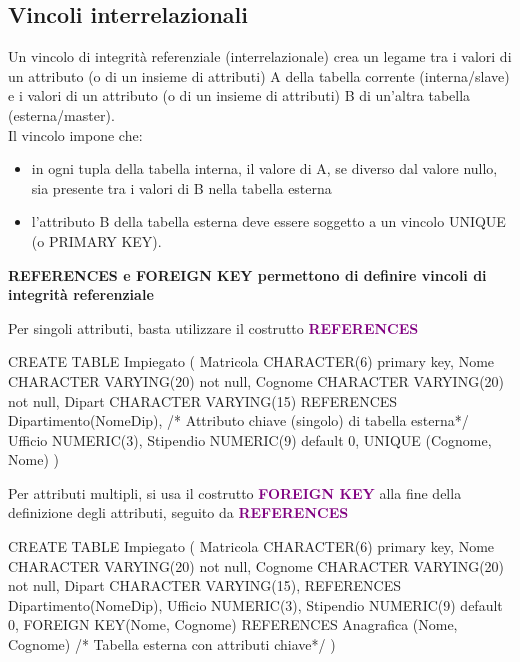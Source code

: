   \subsection{Vincoli interrelazionali}
  Un vincolo di integrità referenziale (interrelazionale) crea un legame tra i valori di un attributo (o di un insieme di attributi) A della tabella corrente (interna/slave) e i valori di un attributo (o di un insieme di attributi) B di un'altra tabella (esterna/master).\\[0.2ex]
  Il vincolo impone che:
  \begin{itemize}[itemsep=\smallskipamount]
    \item in ogni tupla della tabella interna, il valore di A, se diverso dal valore nullo, sia presente tra i valori di B nella tabella esterna
    \item  l'attributo B della tabella esterna deve essere soggetto a un vincolo UNIQUE (o PRIMARY KEY).
  \end{itemize}
  

  \textbf{REFERENCES e FOREIGN KEY permettono di definire vincoli di integrità referenziale}

Per singoli attributi, basta utilizzare il costrutto \textcolor{purple}{\textbf{REFERENCES}}
\begin{codiceSQL}
CREATE TABLE Impiegato (
  Matricola CHARACTER(6) primary key,
  Nome CHARACTER VARYING(20)  not null,
  Cognome CHARACTER VARYING(20)  not null,
  Dipart CHARACTER VARYING(15) 
  REFERENCES Dipartimento(NomeDip),   
  /* Attributo chiave (singolo) di tabella esterna*/
  Ufficio NUMERIC(3),
  Stipendio  NUMERIC(9) default 0,
  UNIQUE (Cognome, Nome)
)
\end{codiceSQL}

Per attributi multipli, si usa il costrutto \textcolor{purple}{\textbf{FOREIGN KEY}} alla fine della definizione degli attributi, seguito da \textcolor{purple}{\textbf{REFERENCES}}
\begin{codiceSQL}
CREATE TABLE Impiegato (
  Matricola CHARACTER(6) primary key,
  Nome CHARACTER VARYING(20)  not null,
  Cognome CHARACTER VARYING(20)  not null,
  Dipart CHARACTER VARYING(15),
  REFERENCES Dipartimento(NomeDip),   
  Ufficio NUMERIC(3),
  Stipendio  NUMERIC(9) default 0,
  FOREIGN KEY(Nome, Cognome)
    REFERENCES Anagrafica (Nome, Cognome) 
    /* Tabella esterna con attributi chiave*/
)
\end{codiceSQL}


